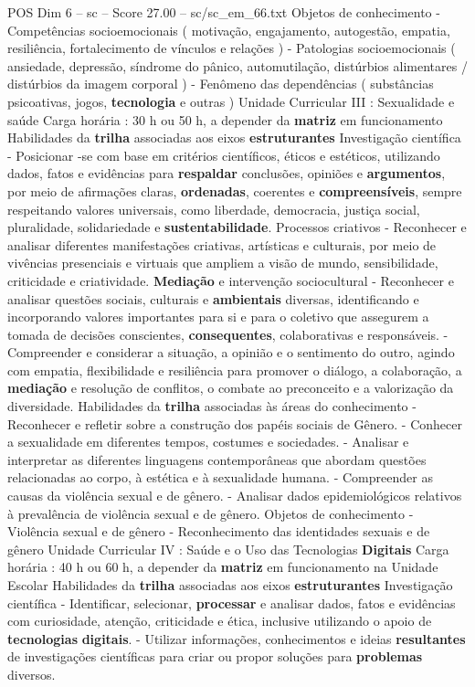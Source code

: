 \begin{textsample}{POS Dim 6 – sc – Score 27.00 – sc/sc\_em\_66.txt}
Objetos de conhecimento - Competências socioemocionais ( motivação, engajamento, autogestão, empatia, resiliência, fortalecimento de vínculos e relações ) - Patologias socioemocionais ( ansiedade, depressão, síndrome do pânico, automutilação, distúrbios alimentares / distúrbios da imagem corporal ) - Fenômeno das dependências ( substâncias psicoativas, jogos, \textbf{tecnologia} e outras ) Unidade Curricular III : Sexualidade e saúde Carga horária : 30 h ou 50 h, a depender da \textbf{matriz} em funcionamento Habilidades da \textbf{trilha} associadas aos eixos \textbf{estruturantes} Investigação científica - Posicionar -se com base em critérios científicos, éticos e estéticos, utilizando dados, fatos e evidências para \textbf{respaldar} conclusões, opiniões e \textbf{argumentos}, por meio de afirmações claras, \textbf{ordenadas}, coerentes e \textbf{compreensíveis}, sempre respeitando valores universais, como liberdade, democracia, justiça social, pluralidade, solidariedade e \textbf{sustentabilidade}.
Processos criativos - Reconhecer e analisar diferentes manifestações criativas, artísticas e culturais, por meio de vivências presenciais e virtuais que ampliem a visão de mundo, sensibilidade, criticidade e criatividade. \textbf{Mediação} e intervenção sociocultural - Reconhecer e analisar questões sociais, culturais e \textbf{ambientais} diversas, identificando e incorporando valores importantes para si e para o coletivo que assegurem a tomada de decisões conscientes, \textbf{consequentes}, colaborativas e responsáveis. - Compreender e considerar a situação, a opinião e o sentimento do outro, agindo com empatia, flexibilidade e resiliência para promover o diálogo, a colaboração, a \textbf{mediação} e resolução de conflitos, o combate ao preconceito e a valorização da diversidade.
Habilidades da \textbf{trilha} associadas às áreas do conhecimento - Reconhecer e refletir sobre a construção dos papéis sociais de Gênero. - Conhecer a sexualidade em diferentes tempos, costumes e sociedades. - Analisar e interpretar as diferentes linguagens contemporâneas que abordam questões relacionadas ao corpo, à estética e à sexualidade humana. - Compreender as causas da violência sexual e de gênero. - Analisar dados epidemiológicos relativos à prevalência de violência sexual e de gênero.
Objetos de conhecimento - Violência sexual e de gênero - Reconhecimento das identidades sexuais e de gênero Unidade Curricular IV : Saúde e o Uso das Tecnologias \textbf{Digitais} Carga horária : 40 h ou 60 h, a depender da \textbf{matriz} em funcionamento na Unidade Escolar Habilidades da \textbf{trilha} associadas aos eixos \textbf{estruturantes} Investigação científica - Identificar, selecionar, \textbf{processar} e analisar dados, fatos e evidências com curiosidade, atenção, criticidade e ética, inclusive utilizando o apoio de \textbf{tecnologias} \textbf{digitais}. - Utilizar informações, conhecimentos e ideias \textbf{resultantes} de investigações científicas para criar ou propor soluções para \textbf{problemas} diversos.

\end{textsample}
